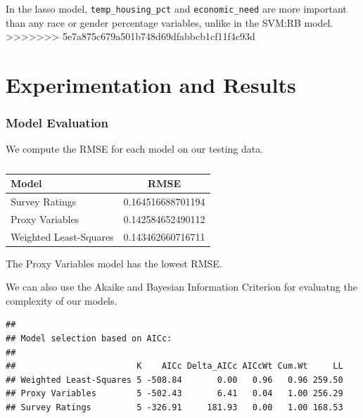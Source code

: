 \documentclass[
  man,floatsintext]{apa6}
\begin{document}
In the lasso model, \texttt{temp\_housing\_pct} and \texttt{economic\_need} are more important than any race or gender percentage variables, unlike in the SVM:RB model.
>>>>>>> 5e7a875c679a501b748d69dfabbcb1cf11f4c93d

\hypertarget{experimentation-and-results}{%
\section{Experimentation and Results}\label{experimentation-and-results}}

\hypertarget{model-evaluation}{%
\subsubsection{Model Evaluation}\label{model-evaluation}}

We compute the RMSE for each model on our testing data.

\begin{table}[H]

\begin{center}
\begin{threeparttable}

\caption{\label{tab:RMSE}}

\begin{tabular}{ll}
\toprule
Model & \multicolumn{1}{c}{RMSE}\\
\midrule
Survey Ratings & 0.164516688701194\\
Proxy Variables & 0.142584652490112\\
Weighted Least-Squares & 0.143462660716711\\
\bottomrule
\end{tabular}

\end{threeparttable}
\end{center}

\end{table}

The Proxy Variables model has the lowest RMSE.

We can also use the Akaike and Bayesian Information Criterion for evaluatng the complexity of our models.

\begin{verbatim}
## 
## Model selection based on AICc:
## 
##                        K    AICc Delta_AICc AICcWt Cum.Wt     LL
## Weighted Least-Squares 5 -508.84       0.00   0.96   0.96 259.50
## Proxy Variables        5 -502.43       6.41   0.04   1.00 256.29
## Survey Ratings         5 -326.91     181.93   0.00   1.00 168.53
\end{verbatim}
\end{document}
